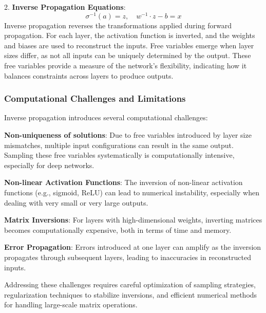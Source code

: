 \documentclass{article}
\begin{document}
\begin{center}
\end{center}

2. \textbf{Inverse Propagation Equations}:
\[
 \sigma^{-1}(a) = z, \quad w^{-1} \cdot z  - b = x
\]
Inverse propagation reverses the transformations applied during forward propagation. For each layer, the activation function is inverted, and the weights and biases are used to reconstruct the inputs. Free variables emerge when layer sizes differ, as not all inputs can be uniquely determined by the output. These free variables provide a measure of the network's flexibility, indicating how it balances constraints across layers to produce outputs.

\subsubsection*{Computational Challenges and Limitations}
Inverse propagation introduces several computational challenges:

\textbf{Non-uniqueness of solutions}: Due to free variables introduced by layer size mismatches, multiple input configurations can result in the same output. Sampling these free variables systematically is computationally intensive, especially for deep networks.

\textbf{Non-linear Activation Functions}: The inversion of non-linear activation functions (e.g., sigmoid, ReLU) can lead to numerical instability, especially when dealing with very small or very large outputs.

\textbf{Matrix Inversions}: For layers with high-dimensional weights, inverting matrices becomes computationally expensive, both in terms of time and memory.

\textbf{Error Propagation}: Errors introduced at one layer can amplify as the inversion propagates through subsequent layers, leading to inaccuracies in reconstructed inputs.

Addressing these challenges requires careful optimization of sampling strategies, regularization techniques to stabilize inversions, and efficient numerical methods for handling large-scale matrix operations.
\end{document}
